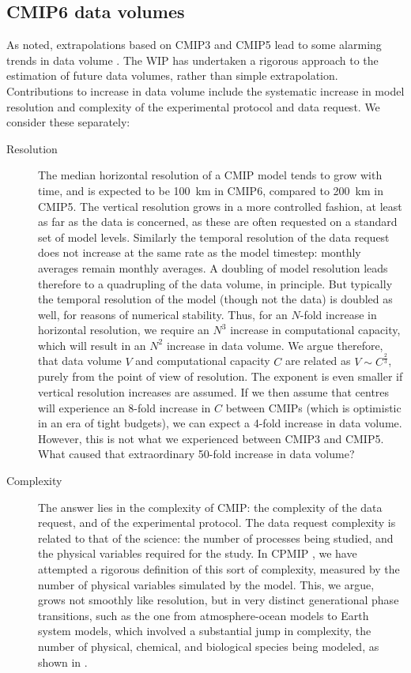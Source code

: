 \documentclass[gmd,manuscript]{copernicus}
\newcommand{\bibref}[1] { \cite{ref:#1}}
\newcommand{\pipref}[1] {\citep{ref:#1}}
\begin{document}
\subsection{CMIP6 data volumes}
\label{sec:dvol}

As noted, extrapolations based on CMIP3 and CMIP5 lead to some
alarming trends in data volume \citep[see
e.g.,][]{ref:overpecketal2011}. The WIP has undertaken a rigorous
approach to the estimation of future data volumes, rather than simple
extrapolation. Contributions to increase in data volume include the
systematic increase in model resolution and complexity of the
experimental protocol and data request. We consider these separately:

\begin{description}
\item[Resolution] The median horizontal resolution of a CMIP model
  tends to grow with time, and is expected to be 100~km in CMIP6,
  compared to 200~km in CMIP5. The vertical resolution grows in a more
  controlled fashion, at least as far as the data is concerned, as
  these are often requested on a standard set of model levels.
  Similarly the temporal resolution of the data request does not
  increase at the same rate as the model timestep: monthly averages
  remain monthly averages. A doubling of model resolution leads
  therefore to a quadrupling of the data volume, in principle. But
  typically the temporal resolution of the model (though not the data)
  is doubled as well, for reasons of numerical stability. Thus, for an
  $N$-fold increase in horizontal resolution, we require an $N^3$
  increase in computational capacity, which will result in an $N^2$
  increase in data volume. We argue therefore, that data volume $V$ and
  computational capacity $C$ are related as $V \sim C^\frac23$, purely
  from the point of view of resolution. The exponent is even smaller
  if vertical resolution increases are assumed. If we then assume that
  centres will experience an 8-fold increase in $C$ between CMIPs
  (which is optimistic in an era of tight budgets), we can expect a
  4-fold increase in data volume. However, this is not what we
  experienced between CMIP3 and CMIP5. What caused that extraordinary
  50-fold increase in data volume?
\item[Complexity] The answer lies in the complexity of CMIP: the
  complexity of the data request, and of the experimental protocol.
  The data request complexity is related to that of the science: the
  number of processes being studied, and the physical variables
  required for the study. In CPMIP \pipref{balajietal2017}, we have
  attempted a rigorous definition of this sort of complexity, measured
  by the number of physical variables simulated by the model. This, we
  argue, grows not smoothly like resolution, but in very distinct
  generational phase transitions, such as the one from
  atmosphere-ocean models to Earth system models, which involved a
  substantial jump in complexity, the number of physical, chemical,
  and biological species being modeled, as shown in
  \bibref{balajietal2017}.


\end{description}
\end{document}
